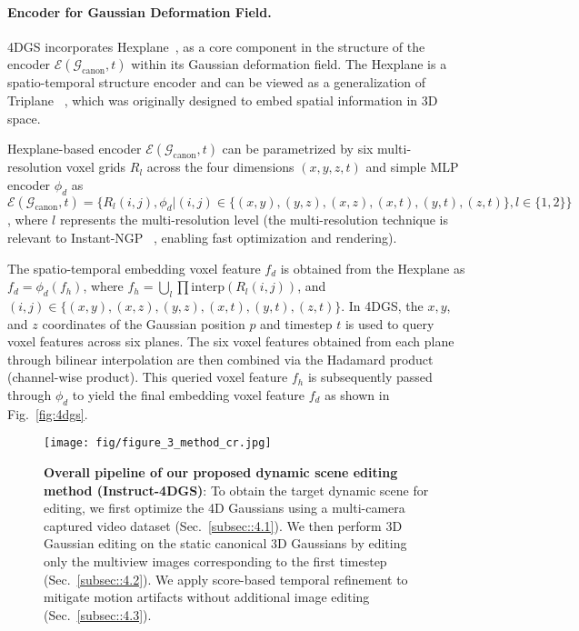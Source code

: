 \vspace{-4mm}
\paragraph{Encoder for Gaussian Deformation Field.}
4DGS incorporates Hexplane~\cite{ref_15_kplanes,ref_16_hexplane}, as a core component in the structure of the encoder $\mathcal{E}(\mathcal{G}_{\text{canon}}, t)$ within its Gaussian deformation field. The Hexplane is a spatio-temporal structure encoder and can be viewed as a generalization of Triplane ~\cite{ref_24_eg3d}, which was originally designed to embed spatial information in 3D space.

Hexplane-based encoder $\mathcal{E}(\mathcal{G}_{\text{canon}}, t)$ can be parametrized by six multi-resolution voxel grids $R_l$ across the four dimensions $(x, y, z, t)$ and simple MLP encoder $\phi_d$ as $
 \mathcal{E}(\mathcal{G}_{\text{canon}},t)=\{R_l(i,j), \phi_d | (i,j) \in \{(x,y),(y,z),(x,z),(x,t),(y,t),(z,t)\}, l \in \{1,2\}\}$, where $l$ represents the multi-resolution level (the multi-resolution technique is relevant to Instant-NGP ~\cite{ref_23_instantNGP}, enabling fast optimization and rendering).

The spatio-temporal embedding voxel feature $f_d$ is obtained from the Hexplane as $f_d = \phi_d(f_h)$, where $f_h = \bigcup_l \prod \text{interp}(R_l(i,j))$, and $(i,j) \in \{(x,y),(x,z),(y,z),(x,t),(y,t),(z,t)\}$. In 4DGS, the $x, y$, and $z$ coordinates of the Gaussian position $p$ and timestep $t$ is used to query voxel features across six planes. The six voxel features obtained from each plane through bilinear interpolation are then combined via the Hadamard product (channel-wise product). This queried voxel feature $f_h$ is subsequently passed through $\phi_d$ to yield the final embedding voxel feature $f_d$ as shown in Fig.~\ref{fig:4dgs}.


\begin{figure*}[h]
\centering
    \texttt{[image: fig/figure\_3\_method\_cr.jpg]}
    \caption{\textbf{Overall pipeline of our proposed dynamic scene editing method (Instruct-4DGS)}: To obtain the target dynamic scene for editing, we first optimize the 4D Gaussians using a multi-camera captured video dataset (Sec.~\ref{subsec::4.1}). We then perform 3D Gaussian editing on the static canonical 3D Gaussians by editing only the multiview images corresponding to the first timestep (Sec.~\ref{subsec::4.2}). We apply score-based temporal refinement to mitigate motion artifacts without additional image editing (Sec.~\ref{subsec::4.3}).}
    \label{fig:method}
    \vspace{-1mm}
\end{figure*}

